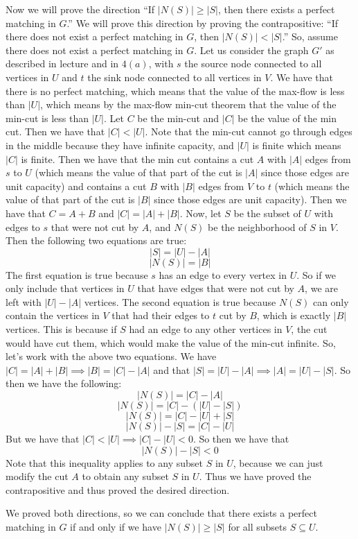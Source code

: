 \documentclass{article}
\begin{document}
\begin{description}
        Now we will prove the direction ``If $|N(S)| \ge |S|$, then there exists
        a perfect matching in $G$.'' We will prove this direction by proving the
        contrapositive: ``If there does not exist a perfect matching in $G$,
        then $|N(S)| < |S|$.'' So, assume there does not exist a perfect
        matching in $G$. Let us consider the graph $G'$ as described in lecture
        and in $4(a)$, with $s$ the source node connected to all vertices in $U$
        and $t$ the sink node connected to all vertices in $V$. We have that
        there is no perfect matching, which means that the value of the max-flow
        is less than $|U|$, which means by the max-flow min-cut theorem that the
        value of the min-cut is less than $|U|$. Let $C$ be the min-cut and
        $|C|$ be the value of the min
        cut. Then we have that $|C| < |U|$. Note that the min-cut cannot go
        through edges in the middle because they have infinite capacity, and
        $|U|$ is finite which means $|C|$ is finite. Then we have that the min
        cut contains a cut $A$ with $|A|$ edges from $s$ to $U$ (which means the value of that
        part of the cut is $|A|$ since those edges are unit capacity) and
        contains a cut $B$ with $|B|$ edges from $V$ to $t$ (which means the value of that
        part of the cut is $|B|$ since those edges are unit capacity). Then we
        have that $C = A + B$ and $|C| = |A| + |B|$. Now, let $S$ be the subset of $U$ with edges to
        $s$ that were not cut by $A$, and $N(S)$ be
        the neighborhood of $S$ in $V$. Then the following two equations are
        true:
        \[ |S| = |U| - |A| \]
        \[ |N(S)| = |B| \]
        The first equation is true because $s$ has an edge to every vertex in $U$. So if
        we only include that vertices in $U$ that have edges that were not cut
        by $A$, we are left with $|U| - |A|$ vertices. The second equation is true
        because $N(S)$ can only contain the vertices in $V$ that had their edges
        to $t$ cut by $B$, which is exactly $|B|$ vertices. This is because if $S$
        had an edge to any other vertices in $V$, the cut would have cut them,
        which would make the value of the min-cut infinite. So, let's work with
        the above two equations. We have $|C| = |A| + |B| \implies |B| = |C| -
        |A|$ and that $|S| = |U| - |A| \implies |A| = |U| - |S|$. So then we have the following:
        \[ |N(S)| = |C| - |A| \]
        \[ |N(S)| = |C| - (|U| - |S|) \]
        \[ |N(S)| = |C| - |U| + |S| \]
        \[ |N(S)| - |S| = |C| - |U| \]
        But we have that $|C| < |U| \implies |C| - |U| < 0$. So then we have that
        \[ |N(S)| - |S| < 0 \]
        Note that this inequality applies to any subset $S$ in $U$, because we
        can just modify the cut $A$ to obtain any subset $S$ in $U$. Thus we
        have proved the contrapositive and thus proved the desired direction.

        We proved both directions, so we can conclude that there exists a
        perfect matching in $G$ if and only if we have $|N(S)| \ge |S|$ for all
        subsets $S \subseteq U$.
\end{description}
\newpage
\end{document}
